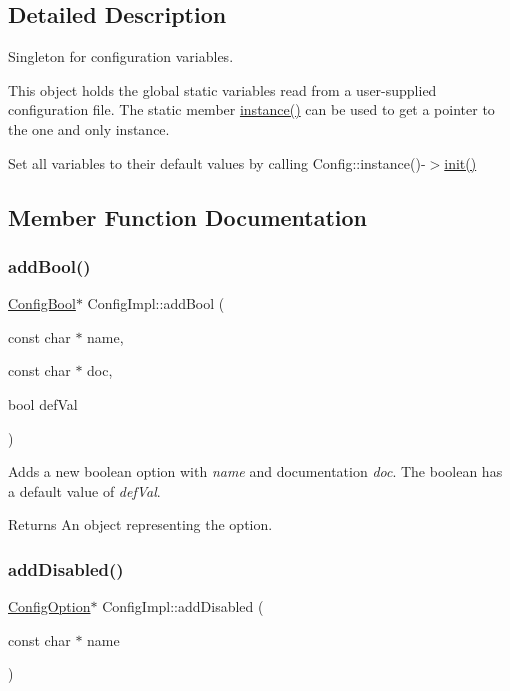 \subsection{Detailed Description}
Singleton for configuration variables.

This object holds the global static variables read from a user-\/supplied configuration file. The static member \mbox{\hyperlink{class_config_impl_a1415dd4c0a72ff3b7a36829eecb8944d}{instance()}} can be used to get a pointer to the one and only instance.

Set all variables to their default values by calling Config\+::instance()-\/$>$\mbox{\hyperlink{class_config_impl_a50654e77279eecd43b0dd91cb21420e5}{init()}} 

\subsection{Member Function Documentation}
\mbox{\label{class_config_impl_aa555f51d70432403c234259dca81f666}} 
\subsubsection{\texorpdfstring{addBool()}{addBool()}}
{\footnotesize\ttfamily \mbox{\hyperlink{class_config_bool}{Config\+Bool}}$\ast$ Config\+Impl\+::add\+Bool (\begin{DoxyParamCaption}\item[{const char $\ast$}]{name,  }\item[{const char $\ast$}]{doc,  }\item[{bool}]{def\+Val }\end{DoxyParamCaption})\hspace{0.3cm}{\ttfamily [inline]}}

Adds a new boolean option with {\itshape name} and documentation {\itshape doc}. The boolean has a default value of {\itshape def\+Val}. \begin{DoxyReturn}{Returns}
An object representing the option. 
\end{DoxyReturn}
\mbox{\label{class_config_impl_a6944e4722cb76a3630fb42fafa52e0f2}} 
\subsubsection{\texorpdfstring{addDisabled()}{addDisabled()}}
{\footnotesize\ttfamily \mbox{\hyperlink{class_config_option}{Config\+Option}}$\ast$ Config\+Impl\+::add\+Disabled (\begin{DoxyParamCaption}\item[{const char $\ast$}]{name }\end{DoxyParamCaption})\hspace{0.3cm}{\ttfamily [inline]}}

